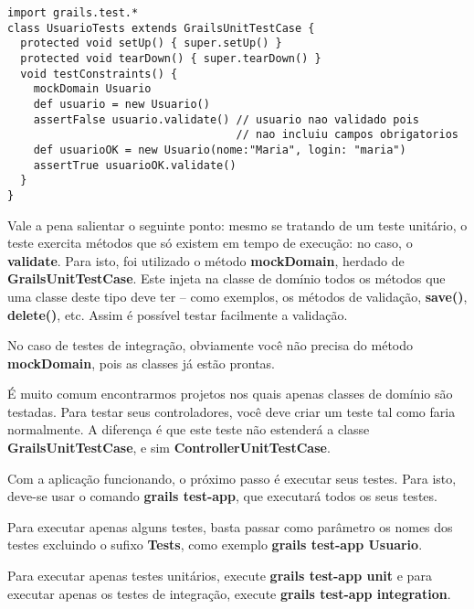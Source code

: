 \lstset{language=Java}
\begin{lstlisting}[frame=single,            captionpos=b,            float=htbp,
    basicstyle=\fontsize{8}{9}\selectfont, showstringspaces=false]
import grails.test.*
class UsuarioTests extends GrailsUnitTestCase {
  protected void setUp() { super.setUp() }
  protected void tearDown() { super.tearDown() }
  void testConstraints() {
    mockDomain Usuario
    def usuario = new Usuario()
    assertFalse usuario.validate() // usuario nao validado pois
                                   // nao incluiu campos obrigatorios
    def usuarioOK = new Usuario(nome:"Maria", login: "maria")
    assertTrue usuarioOK.validate()
  }
}
\end{lstlisting}

Vale a pena salientar o seguinte  ponto: mesmo se tratando de um teste unitário,
o teste exercita  métodos que só existem  em tempo de execução: no  caso, o {\bf
  validate}.  Para  isto, foi  utilizado o método  {\bf mockDomain},  herdado de
{\bf GrailsUnitTestCase}. Este injeta na  classe de domínio todos os métodos que
uma classe  deste tipo deve ter –  como exemplos, os métodos  de validação, {\bf
  save()}, {\bf delete()}, etc. Assim é possível testar facilmente a validação.

No caso  de testes  de integração,  obviamente você não  precisa do  método {\bf
  mockDomain}, pois as classes já estão prontas.

\vspace{0.5cm}
 É muito comum encontrarmos
projetos nos  quais apenas  classes de domínio  são testadas.  Para  testar seus
controladores, você deve criar um  teste tal como faria normalmente. A diferença
é que  este teste não  estenderá a classe  {\bf GrailsUnitTestCase}, e  sim {\bf
  ControllerUnitTestCase}. 

\vspace{0.5cm}
 Com a  aplicação funcionando,  o próximo
passo é  executar seus testes.   Para isto, deve-se  usar o comando  {\bf grails
  test-app}, que executará todos os seus testes.

Para executar  apenas alguns  testes, basta passar  como parâmetro os  nomes dos
testes  excluindo  o sufixo  {\bf  Tests},  como  exemplo {\bf  grails  test-app
  Usuario}.

Para executar apenas testes unitários, execute {\bf grails test-app unit} e para
executar  apenas   os  testes  de  integração,  execute   {\bf  grails  test-app
  integration}.

